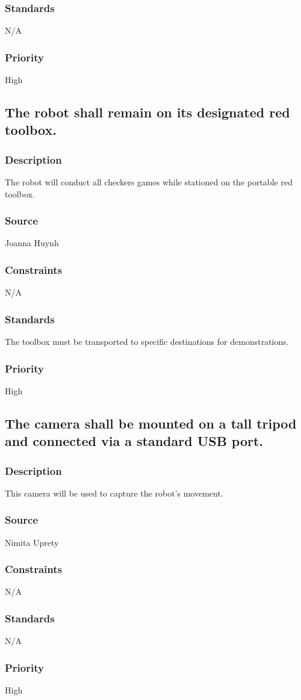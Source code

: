 \subsubsection{Standards}
N/A
\subsubsection{Priority}
High

\subsection{The robot shall remain on its designated red toolbox.}
\subsubsection{Description}
The robot will conduct all checkers games while stationed on the portable red toolbox.
\subsubsection{Source}
Joanna Huynh
\subsubsection{Constraints}
N/A
\subsubsection{Standards}
The toolbox must be transported to specific destinations for demonstrations.
\subsubsection{Priority}
High

\subsection{The camera shall be mounted on a tall tripod and connected via a standard USB port.}
\subsubsection{Description}
This camera will be used to capture the robot's movement.
\subsubsection{Source}
Nimita Uprety
\subsubsection{Constraints}
N/A
\subsubsection{Standards}
N/A
\subsubsection{Priority}
High